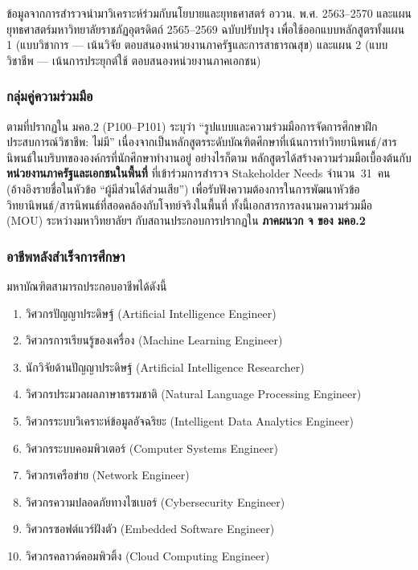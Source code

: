 ข้อมูลจากการสำรวจนำมาวิเคราะห์ร่วมกับนโยบายและยุทธศาสตร์ อววน. พ.ศ. 2563--2570 และแผนยุทธศาสตร์มหาวิทยาลัยราชภัฏอุตรดิตถ์ 2565--2569 ฉบับปรับปรุง เพื่อใช้ออกแบบหลักสูตรทั้งแผน 1 (แบบวิชาการ --- เน้นวิจัย ตอบสนองหน่วยงานภาครัฐและการสาธารณสุข) และแผน 2 (แบบวิชาชีพ --- เน้นการประยุกต์ใช้ ตอบสนองหน่วยงานภาคเอกชน)

\subsubsection*{กลุ่มคู่ความร่วมมือ}

ตามที่ปรากฏใน มคอ.2 (P100--P101) ระบุว่า ``รูปแบบและความร่วมมือการจัดการศึกษาฝึกประสบการณ์วิชาชีพ: ไม่มี'' เนื่องจากเป็นหลักสูตรระดับบัณฑิตศึกษาที่เน้นการทำวิทยานิพนธ์/สารนิพนธ์ในบริบทขององค์กรที่นักศึกษาทำงานอยู่ อย่างไรก็ตาม หลักสูตรได้สร้างความร่วมมือเบื้องต้นกับ \textbf{หน่วยงานภาครัฐและเอกชนในพื้นที่} ที่เข้าร่วมการสำรวจ Stakeholder Needs จำนวน~31~คน (อ้างอิงรายชื่อในหัวข้อ ``ผู้มีส่วนได้ส่วนเสีย'') เพื่อรับฟังความต้องการในการพัฒนาหัวข้อวิทยานิพนธ์/สารนิพนธ์ที่สอดคล้องกับโจทย์จริงในพื้นที่ ทั้งนี้เอกสารการลงนามความร่วมมือ (MOU) ระหว่างมหาวิทยาลัยฯ กับสถานประกอบการปรากฏใน \textbf{ภาคผนวก จ ของ มคอ.2}

\subsubsection*{อาชีพหลังสำเร็จการศึกษา}

มหาบัณฑิตสามารถประกอบอาชีพได้ดังนี้

\begin{enumerate}
  \item วิศวกรปัญญาประดิษฐ์ (Artificial Intelligence Engineer)
  \item วิศวกรการเรียนรู้ของเครื่อง (Machine Learning Engineer)
  \item นักวิจัยด้านปัญญาประดิษฐ์ (Artificial Intelligence Researcher)
  \item วิศวกรประมวลผลภาษาธรรมชาติ (Natural Language Processing Engineer)
  \item วิศวกรระบบวิเคราะห์ข้อมูลอัจฉริยะ (Intelligent Data Analytics Engineer)
  \item วิศวกรระบบคอมพิวเตอร์ (Computer Systems Engineer)
  \item วิศวกรเครือข่าย (Network Engineer)
  \item วิศวกรความปลอดภัยทางไซเบอร์ (Cybersecurity Engineer)
  \item วิศวกรซอฟต์แวร์ฝังตัว (Embedded Software Engineer)
  \item วิศวกรคลาวด์คอมพิวติ้ง (Cloud Computing Engineer)
\end{enumerate}

